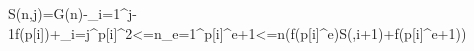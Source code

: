 S(n,j)=G(n)-\sum_{i=1}^{j-1}f(p[i])+\sum_{i=j}^{p[i]^2<=n}\sum_{e=1}^{p[i]^{e+1}<=n}(f(p[i]^e)S(\lfloor{}\rfloor,i+1)+f(p[i]^{e+1}))

